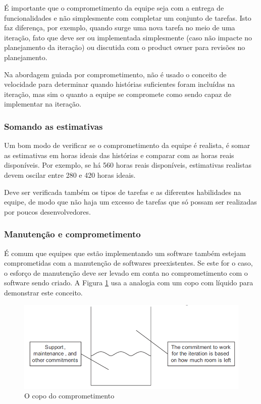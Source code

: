 \documentclass[a4paper,abntfigtabnum,noindentfirst]{abnt}
\begin{document}
É importante que o comprometimento da equipe seja com a entrega de funcionalidades e não simplesmente com completar um conjunto de tarefas. Isto faz diferença, por exemplo, quando surge uma nova tarefa no meio de uma iteração, fato que deve ser ou implementada simplesmente (caso não impacte no planejamento da iteração) ou discutida com o product owner para revisões no planejamento.

Na abordagem guiada por comprometimento, não é usado o conceito de velocidade para determinar quando histórias suficientes foram incluídas na iteração, mas sim o quanto a equipe se compromete como sendo capaz de implementar na iteração.

\subsubsection{Somando as estimativas}

Um bom modo de verificar se o comprometimento da equipe é realista, é somar as estimativas em horas ideais das histórias e comparar com as horas reais disponíveis. Por exemplo, se há 560 horas reais disponíveis, estimativas realistas devem oscilar entre 280 e 420 horas ideais.

Deve ser verificada também os tipos de tarefas e as diferentes habilidades na equipe, de modo que não haja um excesso de tarefas que só possam ser realizadas por poucos desenvolvedores.

\subsubsection{Manutenção e comprometimento}

É comum que equipes que estão implementando um software também estejam comprometidas com a manutenção de softwares preexistentes. Se este for o caso, o esforço de manutenção deve ser levado em conta no comprometimento com o software sendo criado. A Figura \ref{copo-do-comprometimento} usa a analogia com um copo com líquido para demonstrar este conceito.

\begin{figure}
  \caption{O copo do comprometimento}
  \label{copo-do-comprometimento}
  \begin{center}
  \includegraphics[scale=0.6]{copo-do-comprometimento}
  \end{center}
\end{figure}
\end{document}
